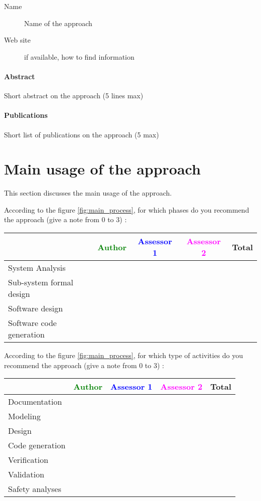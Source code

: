 \begin{description}
\item[Name] Name of the approach
\item[Web site] if available, how to  find information
\end{description}

\paragraph{Abstract} Short abstract on the approach (5 lines max)

\paragraph{Publications} Short list of publications on the approach (5 max)


\section{Main usage of the approach}
\label{main_usage}
This section discusses the main usage of the approach.

According to the figure \ref{fig:main_process}, for which phases do you recommend the approach (give a note from 0 to  3) :

\begin{tabular}{|l | c | c | c | c|}
\hline
& \textcolor{green}{Author} & \textcolor{blue}{Assessor 1} & \textcolor{magenta}{Assessor 2} & Total \\
\hline 
System Analysis & & & &  \\
\hline
Sub-system  formal  design & & & & \\
\hline
Software design & & & & \\
\hline
Software code generation & & & & \\
\hline
\end{tabular}

According to the figure \ref{fig:main_process}, for which type of activities do you recommend the approach (give a note from 0 to  3) :

\begin{tabular}{|l | c | c | c | c|}
\hline
& \textcolor{green}{Author} & \textcolor{blue}{Assessor 1} & \textcolor{magenta}{Assessor 2} & Total \\
\hline 
Documentation & & & &  \\
\hline
Modeling & & & &  \\
\hline
Design & & & & \\
\hline
Code generation & & & & \\
\hline
Verification & & & & \\
\hline
Validation & & & & \\
\hline
Safety analyses & & & & \\
\hline
\end{tabular}

